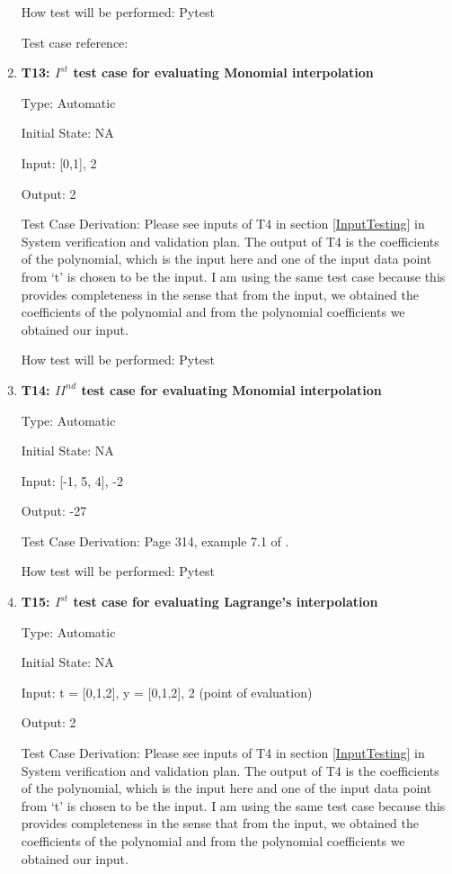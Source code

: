 \documentclass[12pt, titlepage]{article}
\begin{document}
\begin{enumerate}
How test will be performed: Pytest

Test case reference: \cite{BSpline}



\item{\textbf{T13: $I^{st}$ test case for evaluating Monomial interpolation}}

Type: Automatic

Initial State: NA 

Input: [0,1], 2 

Output: 2

Test Case Derivation: Please see inputs of T4 in section \ref{InputTesting} in 
System verification and validation plan. The output of T4 is the coefficients 
of the polynomial, which is the input here and one of the input data point from 
`t' is chosen to be the input. I am using the same test case because this 
provides completeness in the sense that from the input, we obtained the 
coefficients of the polynomial and from the polynomial coefficients we obtained 
our input.

How test will be performed: Pytest



\item{\textbf{T14: ${II}^{nd}$ test case for evaluating Monomial interpolation}}

Type: Automatic

Initial State: NA 

Input: [-1, 5, 4], -2 

Output: -27

Test Case Derivation: Page 314, example 7.1 of \cite{Health1997}. 

How test will be performed: Pytest



\item{\textbf{T15: $I^{st}$ test case for evaluating Lagrange's interpolation}}

Type: Automatic

Initial State: NA 

Input: t = [0,1,2], y = [0,1,2], 2 (point of evaluation)

Output: 2

Test Case Derivation: Please see inputs of T4 in section \ref{InputTesting} in 
System verification and validation plan. The output of T4 is the coefficients 
of the polynomial, which is the input here and one of the input data point from 
`t' is chosen to be the input. I am using the same test case because this 
provides completeness in the sense that from the input, we obtained the 
coefficients of the polynomial and from the polynomial coefficients we obtained 
our input.


\end{enumerate}
\end{document}
